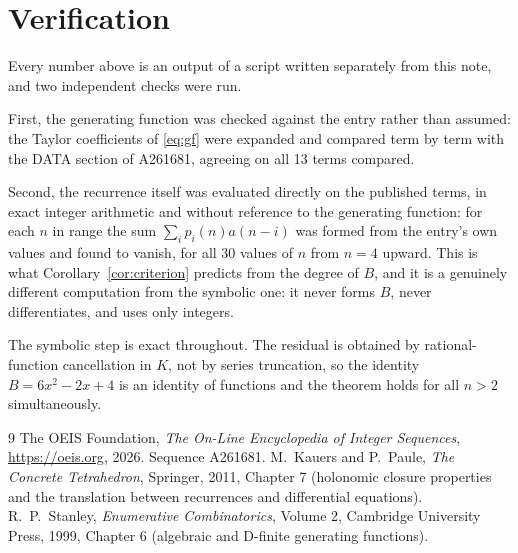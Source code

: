 \documentclass[11pt,a4paper]{article}
\theoremstyle{plain}
\theoremstyle{definition}
\begin{document}
\section{Verification}

Every number above is an output of a script written separately from this note, and two
independent checks were run.

First, the generating function was checked against the entry rather than assumed: the
Taylor coefficients of \eqref{eq:gf} were expanded and compared term by term with the DATA
section of A261681, agreeing on all 13 terms compared.

Second, the recurrence itself was evaluated directly on the published terms, in exact
integer arithmetic and without reference to the generating function: for each $n$ in range
the sum $\sum_{i}p_{i}(n)a(n-i)$ was formed from the entry's own values and found to
vanish, for all 30 values of $n$ from $n=4$ upward. This is what
Corollary~\ref{cor:criterion} predicts from the degree of $B$, and it is a genuinely
different computation from the symbolic one: it never forms $B$, never differentiates, and
uses only integers.

The symbolic step is exact throughout. The residual is obtained by rational-function
cancellation in $K$, not by series truncation, so the identity $B=6 x^{2} - 2 x + 4$ is an
identity of functions and the theorem holds for all $n>2$ simultaneously.

\begin{thebibliography}{9}
 The OEIS Foundation, \emph{The On-Line Encyclopedia of Integer Sequences},
\url{https://oeis.org}, 2026. Sequence A261681.
 M.~Kauers and P.~Paule, \emph{The Concrete Tetrahedron}, Springer, 2011,
Chapter 7 (holonomic closure properties and the translation between recurrences and
differential equations).
 R.~P.~Stanley, \emph{Enumerative Combinatorics}, Volume 2, Cambridge
University Press, 1999, Chapter 6 (algebraic and D-finite generating functions).
\end{thebibliography}
\end{document}
